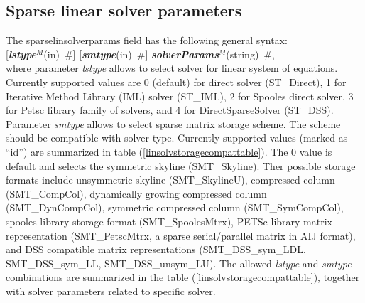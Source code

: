 \documentclass[draft]{article}
\newcommand{\param}[1]{{\em #1}}
\newcommand{\keywordnotype}[1]{\mbox{{\it{\bf{#1}}}}}
\newcommand{\keyword}[2]{\mbox{{\keywordnotype{#1}\tiny (#2)}}}
\newcommand{\field}[2]{\mbox{\keyword{#1}{#2}~\#}}
\newcommand{\optField}[2]{\mbox{[\field{#1}{#2}]}}
\begin{document}
\subsection{Sparse linear solver parameters}
\label{sparselinsolver}
The sparselinsolverparams field has the following general syntax:\\
\optField{lstype$^M$}{in} \optField{smtype}{in} \field{solverParams$^M$}{string},\\
where parameter \param{lstype} allows to select solver for linear system of
equations. Currently supported values are 0 (default) for direct solver
(ST\_Direct), 1 for Iterative Method Library (IML) solver (ST\_IML), 
2 for Spooles direct solver, 3 for Petsc
library family of solvers, and 4 for DirectSparseSolver (ST\_DSS).
Parameter \param{smtype} allows to select sparse matrix storage
scheme. The scheme should be compatible with solver type.
Currently supported values (marked as ``id'') are summarized in table
(\ref{linsolvstoragecompattable}). The 0 value is default and selects
the symmetric skyline (SMT\_Skyline). Ther possible storage formats
include unsymmetric skyline (SMT\_SkylineU), 
compressed column (SMT\_CompCol), dynamically growing compressed
column (SMT\_DynCompCol), symmetric compressed column
(SMT\_SymCompCol), spooles library storage format (SMT\_SpoolesMtrx),
PETSc library matrix representation (SMT\_PetscMtrx, a sparse
serial/parallel matrix in AIJ format), and DSS compatible matrix
representations (SMT\_DSS\_sym\_LDL, SMT\_DSS\_sym\_LL, SMT\_DSS\_unsym\_LU).
The allowed \param{lstype} and \param{smtype} combinations are
summarized in the table (\ref{linsolvstoragecompattable}), together
with solver parameters related to specific solver.
\end{document}
